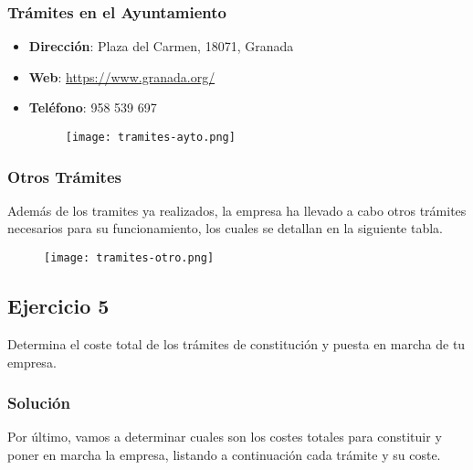 \subsubsection*{Trámites en el Ayuntamiento}
\begin{itemize}
    \item \textbf{Dirección}:  Plaza del Carmen, 18071, Granada
    \item \textbf{Web}: \url{https://www.granada.org/}
    \item \textbf{Teléfono}: 958 539 697

    \begin{figure}[H]
        \centering
        \texttt{[image: tramites-ayto.png]}
    \end{figure}
\end{itemize}

\subsubsection*{Otros Trámites}
Además de los tramites ya realizados, la empresa ha llevado a cabo otros trámites necesarios para su funcionamiento, los cuales se detallan
en la siguiente tabla.

\begin{figure}[H]
    \centering
    \texttt{[image: tramites-otro.png]}
\end{figure}

\subsection{Ejercicio 5}
Determina el coste total de los trámites de constitución y puesta en marcha de tu empresa.

\subsubsection{Solución}
Por último, vamos a determinar cuales son los costes totales para constituir y poner en marcha la empresa, listando a continuación cada trámite y su coste.


